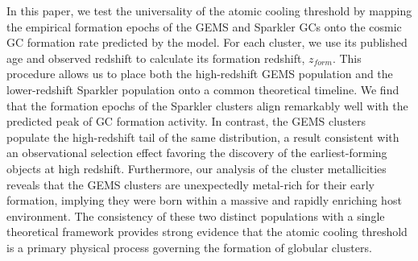 \documentclass[]{article}
\begin{document}
In this paper, we test the universality of the atomic cooling threshold by mapping the empirical formation epochs of the GEMS and Sparkler GCs onto the cosmic GC formation rate predicted by the model. For each cluster, we use its published age and observed redshift to calculate its formation redshift, $z_{form}$. This procedure allows us to place both the high-redshift GEMS population and the lower-redshift Sparkler population onto a common theoretical timeline. We find that the formation epochs of the Sparkler clusters align remarkably well with the predicted peak of GC formation activity. In contrast, the GEMS clusters populate the high-redshift tail of the same distribution, a result consistent with an observational selection effect favoring the discovery of the earliest-forming objects at high redshift. Furthermore, our analysis of the cluster metallicities reveals that the GEMS clusters are unexpectedly metal-rich for their early formation, implying they were born within a massive and rapidly enriching host environment. The consistency of these two distinct populations with a single theoretical framework provides strong evidence that the atomic cooling threshold is a primary physical process governing the formation of globular clusters.
\end{document}
